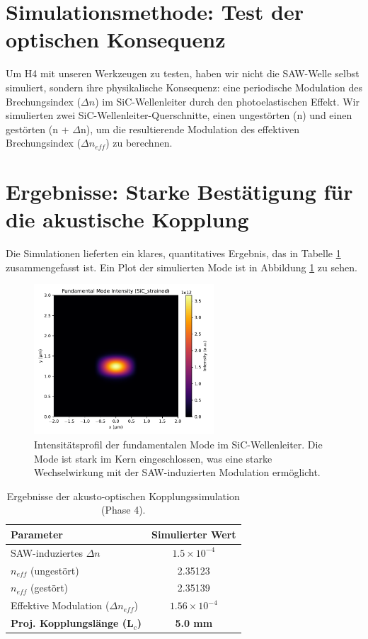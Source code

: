 \documentclass[12pt, a4paper, numbers]{report}
\begin{document}
\section{Simulationsmethode: Test der optischen Konsequenz}
Um H4 mit unseren Werkzeugen zu testen, haben wir nicht die SAW-Welle selbst simuliert, sondern ihre physikalische Konsequenz: eine periodische Modulation des Brechungsindex ($\Delta n$) im SiC-Wellenleiter durch den photoelastischen Effekt. Wir simulierten zwei SiC-Wellenleiter-Querschnitte, einen ungestörten (n) und einen gestörten (n + $\Delta$n), um die resultierende Modulation des effektiven Brechungsindex ($\Delta n_{eff}$) zu berechnen.

\section{Ergebnisse: Starke Bestätigung für die akustische Kopplung}
Die Simulationen lieferten ein klares, quantitatives Ergebnis, das in Tabelle \ref{tab:cycle4} zusammengefasst ist. Ein Plot der simulierten Mode ist in Abbildung \ref{fig:sicmode} zu sehen.

\begin{figure}[htbp]
    \centering
    \includegraphics[width=0.6\textwidth]{simulation_v4_mode_SiC_strained.pdf}
    \caption{Intensitätsprofil der fundamentalen Mode im SiC-Wellenleiter. Die Mode ist stark im Kern eingeschlossen, was eine starke Wechselwirkung mit der SAW-induzierten Modulation ermöglicht.}
    \label{fig:sicmode}
\end{figure}

\begin{table}[htbp]
\caption{Ergebnisse der akusto-optischen Kopplungssimulation (Phase 4).}
\label{tab:cycle4}
\centering
\begin{tabular}{lc}
\toprule
\textbf{Parameter} & \textbf{Simulierter Wert} \\
\midrule
SAW-induziertes $\Delta n$ & $1.5 \times 10^{-4}$ \\
$n_{eff}$ (ungestört) & 2.35123 \\
$n_{eff}$ (gestört) & 2.35139 \\
Effektive Modulation ($\Delta n_{eff}$) & $1.56 \times 10^{-4}$ \\
\textbf{Proj. Kopplungslänge (L$_c$)} & \textbf{5.0 mm} \\
\bottomrule
\end{tabular}
\end{table}
\end{document}
